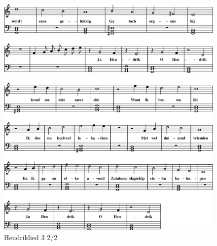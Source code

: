 \begin{figure}[!htbp]
  \includegraphics[width=\textwidth,height=\textheight,keepaspectratio]{../songs/13_hendriklied_3-1.png}
  \caption{Hendriklied 3 2/2}
  \label{fig:13_hendriklied_3_2}
\end{figure}
